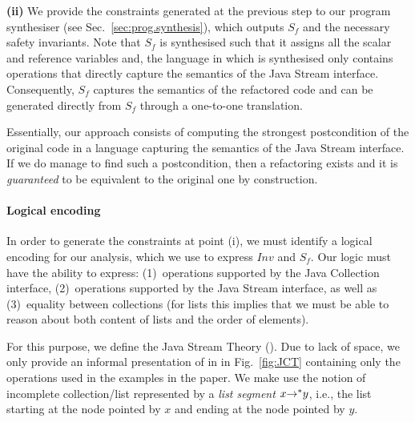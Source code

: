 \documentclass[runningheads,a4paper]{llncs}
\newcommand*{\extended}{}
\begin{document}
%
{\bf(ii)} We provide the constraints generated at the previous step to our program
synthesiser (see Sec.~\ref{sec:prog.synthesis}), which outputs
$S_f$ and 
the necessary safety invariants.
%
Note that $S_f$ is synthesised such that it assigns all 
the scalar and reference variables and, the language
in which is synthesised only contains operations that directly
capture the semantics of the Java Stream interface.
%
%
Consequently, $S_f$ captures the semantics of the refactored code and
 can be generated directly from $S_f$ through a
one-to-one translation.

Essentially, our approach consists of computing the
strongest postcondition of the original code in a language capturing
the semantics of the Java Stream interface.  If we do manage to
find such a postcondition, then a refactoring exists and 
it is {\em guaranteed} to be equivalent to the original
one by construction.

\paragraph{Logical encoding} 
%
In order to generate the constraints at point (i), we must identify a
logical encoding for our analysis, which we use to express
$\mathit{Inv}$ and $S_f$.  %
Our logic must have the ability to express:
(1)~operations supported by the Java Collection interface,
(2)~operations supported by the Java Stream interface, as well as
(3)~equality between collections (for lists this implies that we must
be able to reason about both content of lists and the order of
elements).

For this purpose, we define the Java Stream Theory (\logic). Due to lack
of space, we only provide an informal presentation of \logic in
in Fig.~\ref{fig:JCT}
containing only the operations used in the examples in the
paper.
We make use the
notion of incomplete collection/list represented by a {\em list segment}
$x {\rightarrow^*} y$, i.e., the list starting at the node pointed by $x$ and ending
at the node pointed by $y$.
\end{document}
